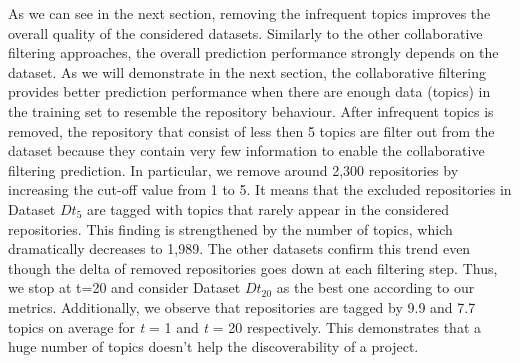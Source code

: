 As we can see in the next section, removing the infrequent topics improves the overall quality of the considered datasets. 
Similarly to the other collaborative filtering approaches, the overall prediction performance strongly depends on the dataset. As we will demonstrate in the next section, the collaborative filtering provides better prediction performance when there are enough data (\ie topics) in the training set to resemble the repository behaviour. After infrequent topics is removed, the repository that consist of less then 5 topics are filter out from the dataset because they contain very few information to enable the collaborative filtering prediction. In particular, we remove around 2,300 repositories by increasing the cut-off value from 1 to 5. It means that the excluded repositories in Dataset $Dt_5$ are tagged with topics that rarely appear in the considered repositories. This finding is strengthened by the number of topics, which dramatically decreases to 1,989. The other datasets confirm this trend even though the delta of removed repositories goes down at each filtering step. Thus, we stop at t=20 and consider Dataset $Dt_{20}$ as the best one according to our metrics. Additionally, we observe that repositories are tagged by 9.9 and 7.7 topics on average for \emph{t} = 1 and \emph{t} = 20 respectively. This demonstrates that a huge number of topics doesn't help the discoverability of a project.

